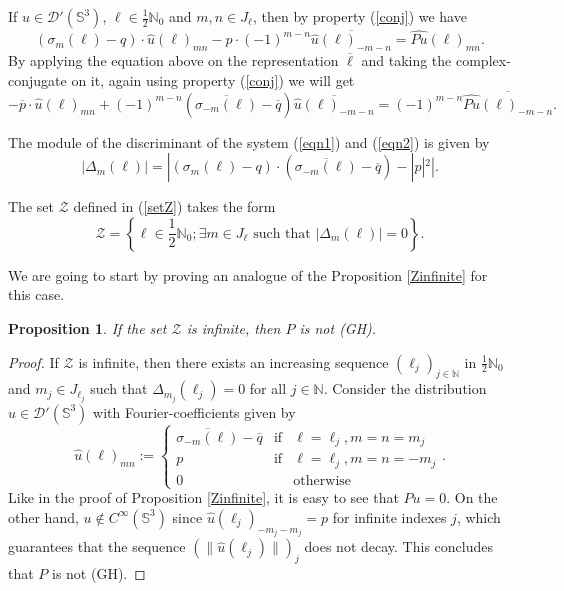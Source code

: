 \documentclass[sn-mathphys-num]{sn-jnl}%
\numberwithin{equation}{section}
\theoremstyle{thmstyleone}
\newtheorem{proposition}[theorem]{Proposition}
\theoremstyle{thmstyletwo}
\theoremstyle{thmstylethree}
\begin{document}
If $u \in \mathcal{D}'(\mathbb{S}^3)$, $\ell \in \frac{1}{2}\mathbb{N}_0$ and $m,n \in J_\ell$, then by property (\ref{conj}) we have
\begin{equation}\label{eqn1} (\sigma_m(\ell)-q) \cdot \widehat{u}(\ell)_{mn}-p \cdot (-1)^{m-n} \overline{\widehat{u}(\ell)_{-m-n}}=\widehat{Pu}(\ell)_{mn}.
\end{equation} 
By applying the equation above on the representation $\overline{\ell}$ and taking the complex-conjugate on it, again using property (\ref{conj}) we will get
\begin{equation}\label{eqn2} -\overline{p} \cdot \widehat{u}(\ell)_{mn}+(-1)^{m-n}(\overline{\sigma_{-m}(\ell)}-\overline{q}) \overline{\widehat{u}(\ell)_{-m -n}} = (-1)^{m-n} \overline{ \widehat{Pu}(\ell)_{-m -n}}.
\end{equation} 

The module of the discriminant of the system (\ref{eqn1}) and (\ref{eqn2}) is given by
$$|\Delta_m(\ell)| = | (\sigma_m(\ell)-q) \cdot (\overline{\sigma_{-m}(\ell)}-\overline{q})-|p|^2|.$$

The set $\mathcal{Z}$ defined in (\ref{setZ}) takes the form
$$\mathcal{Z} = \left\{\ell \in \frac{1}{2}\mathbb{N}_0; \exists m \in J_\ell \textrm{ such that } |\Delta_m(\ell)|=0\right\}.$$

We are going to start by proving an analogue of the Proposition \ref{Zinfinite} for this case.

\begin{proposition}\label{ZinfiniteSU2} If the set $\mathcal{Z}$ is infinite, then $P$ is not (GH).
\end{proposition}

\begin{proof} If $\mathcal{Z}$ is infinite, then there exists an increasing sequence $(\ell_j)_{j \in \mathbb{N}}$ in $\frac{1}{2}\mathbb{N}_0$ and $m_j \in J_{\ell_j}$ such that $\Delta_{m_j}(\ell_j)=0$ for all $j \in \mathbb{N}$. Consider the distribution $u \in \mathcal{D}'(\mathbb{S}^3)$ with Fourier-coefficients given by
$$ \widehat{u}(\ell)_{mn}:= \left\{ \begin{array}{ccc}\overline{\sigma_{-m}(\ell)}-\overline{q} & \textrm{if} & \ell=\ell_j, m=n=m_j \\ p & \textrm{if} & \ell=\ell_j, m=n=-m_j \\ 0 & & \textrm{otherwise}  \end{array}   \right. .$$
Like in the proof of Proposition \ref{Zinfinite}, it is easy to see that $Pu=0$. On the other hand, $u \notin C^\infty(\mathbb{S}^3)$ since $\widehat{u}(\ell_j)_{-m_j -m_j}=p$ for infinite indexes $j$, which guarantees that the sequence $(\|\widehat{u}(\ell_j)\|)_j$ does not decay. This concludes that $P$ is not (GH). 
\end{proof}
\end{document}
